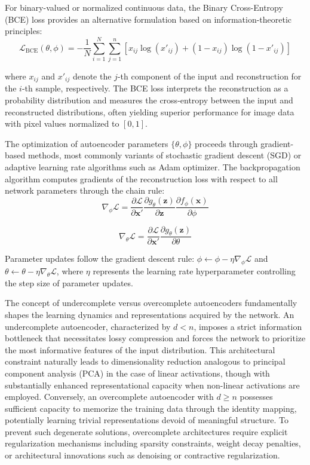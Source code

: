 \documentclass[12pt,a4paper]{report}
\begin{document}
For binary-valued or normalized continuous data, the Binary Cross-Entropy (BCE) loss provides an alternative formulation based on information-theoretic principles:
\begin{equation}
\mathcal{L}_{\text{BCE}}(\theta, \phi) = -\frac{1}{N} \sum_{i=1}^{N} \sum_{j=1}^{n} \left[x_{ij} \log(x'_{ij}) + (1-x_{ij}) \log(1-x'_{ij})\right]
\end{equation}

where $x_{ij}$ and $x'_{ij}$ denote the $j$-th component of the input and reconstruction for the $i$-th sample, respectively. The BCE loss interprets the reconstruction as a probability distribution and measures the cross-entropy between the input and reconstructed distributions, often yielding superior performance for image data with pixel values normalized to $[0,1]$.

The optimization of autoencoder parameters $\{\theta, \phi\}$ proceeds through gradient-based methods, most commonly variants of stochastic gradient descent (SGD) or adaptive learning rate algorithms such as Adam optimizer. The backpropagation algorithm computes gradients of the reconstruction loss with respect to all network parameters through the chain rule:
\begin{equation}
\nabla_\phi \mathcal{L} = \frac{\partial \mathcal{L}}{\partial \mathbf{x}'} \frac{\partial g_\theta(\mathbf{z})}{\partial \mathbf{z}} \frac{\partial f_\phi(\mathbf{x})}{\partial \phi}
\end{equation}

\begin{equation}
\nabla_\theta \mathcal{L} = \frac{\partial \mathcal{L}}{\partial \mathbf{x}'} \frac{\partial g_\theta(\mathbf{z})}{\partial \theta}
\end{equation}

Parameter updates follow the gradient descent rule: $\phi \leftarrow \phi - \eta \nabla_\phi \mathcal{L}$ and $\theta \leftarrow \theta - \eta \nabla_\theta \mathcal{L}$, where $\eta$ represents the learning rate hyperparameter controlling the step size of parameter updates.

The concept of undercomplete versus overcomplete autoencoders fundamentally shapes the learning dynamics and representations acquired by the network. An undercomplete autoencoder, characterized by $d < n$, imposes a strict information bottleneck that necessitates lossy compression and forces the network to prioritize the most informative features of the input distribution. This architectural constraint naturally leads to dimensionality reduction analogous to principal component analysis (PCA) in the case of linear activations, though with substantially enhanced representational capacity when non-linear activations are employed. Conversely, an overcomplete autoencoder with $d \geq n$ possesses sufficient capacity to memorize the training data through the identity mapping, potentially learning trivial representations devoid of meaningful structure. To prevent such degenerate solutions, overcomplete architectures require explicit regularization mechanisms including sparsity constraints, weight decay penalties, or architectural innovations such as denoising or contractive regularization.
\end{document}

